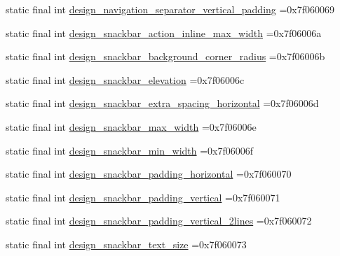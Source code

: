 \begin{DoxyCompactItemize}
\item 
static final int \mbox{\hyperlink{classbr_1_1unb_1_1cic_1_1mp_1_1marketmaster_1_1test_1_1R_1_1dimen_aa6af813da9ef9817a81ef517aa963181}{design\+\_\+navigation\+\_\+separator\+\_\+vertical\+\_\+padding}} =0x7f060069
\item 
static final int \mbox{\hyperlink{classbr_1_1unb_1_1cic_1_1mp_1_1marketmaster_1_1test_1_1R_1_1dimen_a916c4cfe531d13311251610fa5d9d6c7}{design\+\_\+snackbar\+\_\+action\+\_\+inline\+\_\+max\+\_\+width}} =0x7f06006a
\item 
static final int \mbox{\hyperlink{classbr_1_1unb_1_1cic_1_1mp_1_1marketmaster_1_1test_1_1R_1_1dimen_a9489d80034aba320403dc36dd8fcb47b}{design\+\_\+snackbar\+\_\+background\+\_\+corner\+\_\+radius}} =0x7f06006b
\item 
static final int \mbox{\hyperlink{classbr_1_1unb_1_1cic_1_1mp_1_1marketmaster_1_1test_1_1R_1_1dimen_a8bb5e953e614f64ac3404a3e1230eb13}{design\+\_\+snackbar\+\_\+elevation}} =0x7f06006c
\item 
static final int \mbox{\hyperlink{classbr_1_1unb_1_1cic_1_1mp_1_1marketmaster_1_1test_1_1R_1_1dimen_a9e59c2104302316f2d688956e8a53396}{design\+\_\+snackbar\+\_\+extra\+\_\+spacing\+\_\+horizontal}} =0x7f06006d
\item 
static final int \mbox{\hyperlink{classbr_1_1unb_1_1cic_1_1mp_1_1marketmaster_1_1test_1_1R_1_1dimen_a637e2ff96816f9b2416d04dbed62f8a7}{design\+\_\+snackbar\+\_\+max\+\_\+width}} =0x7f06006e
\item 
static final int \mbox{\hyperlink{classbr_1_1unb_1_1cic_1_1mp_1_1marketmaster_1_1test_1_1R_1_1dimen_a8e7ef58d84d759b09c884d2630198d71}{design\+\_\+snackbar\+\_\+min\+\_\+width}} =0x7f06006f
\item 
static final int \mbox{\hyperlink{classbr_1_1unb_1_1cic_1_1mp_1_1marketmaster_1_1test_1_1R_1_1dimen_aeb826c376af6eb46867d2194f79c051b}{design\+\_\+snackbar\+\_\+padding\+\_\+horizontal}} =0x7f060070
\item 
static final int \mbox{\hyperlink{classbr_1_1unb_1_1cic_1_1mp_1_1marketmaster_1_1test_1_1R_1_1dimen_a5cc9849e52c25f19fc03dd6bc2cf7494}{design\+\_\+snackbar\+\_\+padding\+\_\+vertical}} =0x7f060071
\item 
static final int \mbox{\hyperlink{classbr_1_1unb_1_1cic_1_1mp_1_1marketmaster_1_1test_1_1R_1_1dimen_a64108bdee57e9db7a7dfe0eebdd78306}{design\+\_\+snackbar\+\_\+padding\+\_\+vertical\+\_\+2lines}} =0x7f060072
\item 
static final int \mbox{\hyperlink{classbr_1_1unb_1_1cic_1_1mp_1_1marketmaster_1_1test_1_1R_1_1dimen_a5e91bba670d5be98a5a8d82f3b0deb8f}{design\+\_\+snackbar\+\_\+text\+\_\+size}} =0x7f060073

\end{DoxyCompactItemize}
